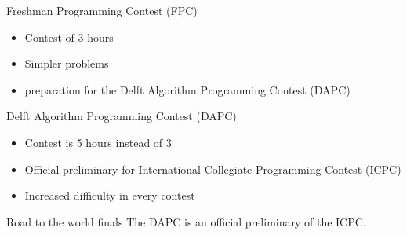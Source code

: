 \documentclass[11pt,pdf, aspectratio=169]{beamer}
\begin{document}
  \begin{frame}{Freshman Programming Contest (FPC)}
    \begin{itemize}
      \item Contest of 3 hours
      \item Simpler problems
      \item preparation for the Delft Algorithm Programming Contest (DAPC)
    \end{itemize}
  \end{frame}
  \begin{frame}{Delft Algorithm Programming Contest (DAPC)}
    \begin{itemize}
      \item Contest is 5 hours instead of 3
      \item Official preliminary for International Collegiate Programming Contest (ICPC)
      \item Increased difficulty in every contest
    \end{itemize}
  \end{frame}
  \begin{frame}{Road to the world finals}
    The DAPC is an official preliminary of the ICPC.
    
  \end{frame}
\end{document}
